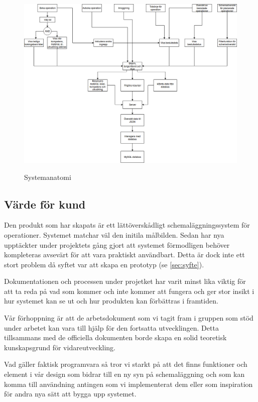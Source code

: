 \begin{figure}[H]
    \includegraphics[width=\textwidth,height=.4\textheight]{Figures/Systemanatomi.png}\\
    \caption{Systemanatomi}
    \label{fig:Systemanatomi}
\end{figure}

\subsection{Värde för kund}
Den produkt som har skapats är ett lättöverskådligt schemaläggningssystem för operationer. Systemet matchar väl den initila målbilden. Sedan har nya upptäckter under projektets gång gjort att systemet förmodligen behöver kompleteras avsevärt för att vara praktiskt användbart. Detta är dock inte ett stort problem då syftet var att skapa en prototyp (se \ref{sec:syfte}).

Dokumentationen och processen under projetket har varit minst lika viktig för att ta reda på vad som kommer och inte kommer att fungera och ger stor insikt i hur systemet kan se ut och hur produkten kan förbättras i framtiden.

Vår förhoppning är att de arbetsdokument som vi tagit fram i gruppen som stöd under arbetet kan vara till hjälp för den fortsatta utvecklingen. Detta tillsammans med de officiella dokumenten borde skapa en solid teoretisk kunskapsgrund för vidareutveckling.

Vad gäller faktisk programvara så tror vi starkt på att det finns funktioner och element i vår design som bidrar till en ny syn på schemaläggning och som kan komma till användning antingen som vi implementerat dem eller som inspiration för andra nya sätt att bygga upp systemet.

